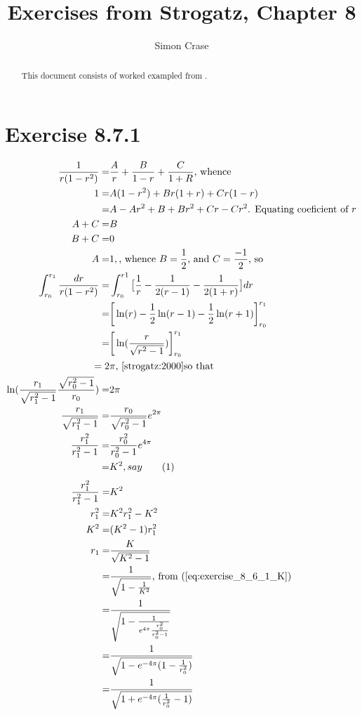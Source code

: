 \documentclass[]{article}
\title{Exercises from Strogatz, Chapter 8}
\author{Simon Crase}
\newcommand\numberthis{\addtocounter{equation}{1}\tag{\theequation}}
\begin{document}
\maketitle

\begin{abstract}
This document consists of worked exampled from \cite[Chapter 8]{strogatz:2000}.
\end{abstract}

\section{Exercise 8.7.1}

\begin{align*}
\frac{1}{r(1-r^2)}=&\frac{A}{r} + \frac{B}{1-r} + \frac{C}{1+R}\text{, whence}\\
1 =& A(1-r^2) + B r(1+r) + Cr(1-r)\\
=& A -A r^2 + B + B r^2 +Cr -Cr^2\text{. Equating coeficient of $r$}\\
A + C =& B\\
B + C =& 0\\
A=& 1,\text{, whence $B=\frac{1}{2}$, and $C=\frac{-1}{2}$, so}\\
\int_{r_0}^{r_1}\frac{dr}{r(1-r^2)}=&\int_{r_0}^{r1} \big[\frac{1}{r}-\frac{1}{2(r-1)}-\frac{1}{2(1+r)}\big] dr\\
=&\bigg[\ln(r)-\frac{1}{2}\ln(r-1)-\frac{1}{2}\ln(r+1)\bigg]_{r_0}^{r_1}\\
=&\bigg[\ln(\frac{r}{\sqrt{r^2-1}})\bigg]_{r_0}^{r_1}\\
=2&\pi\text{, \cite[Example 8.7.1]{strogatz:2000}so that}\\
\ln(\frac{r_1}{\sqrt{r_1^2-1}}\frac{\sqrt{r_0^2-1}}{r_0})=&2 \pi\\
\frac{r_1}{\sqrt{r_1^2-1}}=&\frac{r_0}{\sqrt{r_0^2-1}} e^{2 \pi}\\
\frac{r_1^2}{r_1^2-1}=&\frac{r_0^2}{r_0^2-1} e^{4 \pi}\\
=&K^2{, say}\numberthis\label{eq:exercise_8_6_1_K}
\end{align*}
\begin{align*}
\frac{r_1^2}{r_1^2-1}=&K^2\\
r_1^2=&K^2 r_1^2 - K^2\\
K^2 =& (K^2-1)r_1^2\\
r_1=&\frac{K}{\sqrt{K^2-1}}\\
=&\frac{1}{\sqrt{1-\frac{1}{K^2}}}\text{, from (\ref{eq:exercise_8_6_1_K})}\\
=&\frac{1}{\sqrt{1-\frac{1}{e^{4 \pi} \frac{r_0^2}{r_0^2-1}}}}\\
=&\frac{1}{\sqrt{1-e^{-4\pi}(1-\frac{1}{r_0^2})}}\\
=&\frac{1}{\sqrt{1+e^{-4\pi}(\frac{1}{r_0^2}-1)}}
\end{align*}




\end{document}
